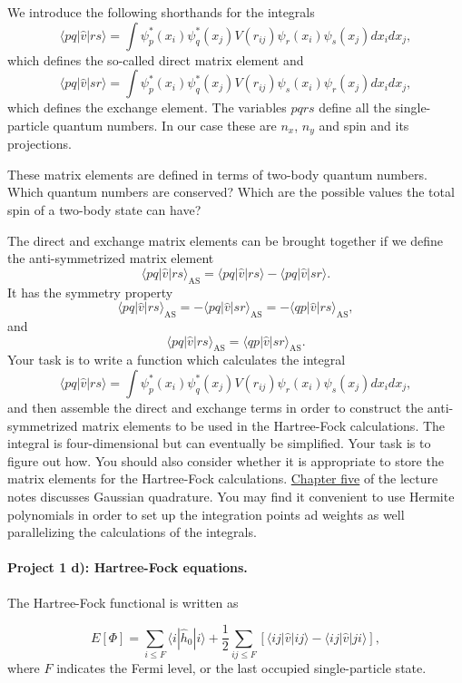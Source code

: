 \documentclass[%
oneside,                 %
final,                   %
10pt]{article}
\begin{document}
We introduce the following shorthands for the  integrals
\[
\langle pq|\hat{v}|rs\rangle =  \int \psi_{p}^*(x_i)\psi_{q}^*(x_j)V(r_{ij})\psi_{r}(x_i)\psi_{s}(x_j)
    dx_idx_j,
\]
which defines the so-called direct matrix element 
and
\[
\langle pq|\hat{v}|sr\rangle = \int \psi_{p}^*(x_i)\psi_{q}^*(x_j)
  V(r_{ij})\psi_{s}(x_i)\psi_{r}(x_j)
  dx_idx_j,  
\]
which defines the exchange element. The variables $pqrs$ define all the single-particle quantum numbers. In our case these are $n_x$, $n_y$ and spin and its projections.

These matrix elements are defined in terms of two-body quantum numbers. Which quantum numbers are conserved?
Which are  the possible values the total spin of a two-body state can have?

The direct and exchange matrix elements can be  brought together if we define the anti-symmetrized matrix element
\[
\langle pq|\hat{v}|rs\rangle_{\mathrm{AS}}= \langle pq|\hat{v}|rs\rangle-\langle pq|\hat{v}|sr\rangle.
\]
It has the symmetry property
\[
\langle pq|\hat{v}|rs\rangle_{\mathrm{AS}}= -\langle pq|\hat{v}|sr\rangle_{\mathrm{AS}}=-\langle qp|\hat{v}|rs\rangle_{\mathrm{AS}},
\]
and
\[
\langle pq|\hat{v}|rs\rangle_{\mathrm{AS}}= \langle qp|\hat{v}|sr\rangle_{\mathrm{AS}}.
\]
Your task is to write a function which calculates the integral 
\[
\langle pq|\hat{v}|rs\rangle =  \int \psi_{p}^*(x_i)\psi_{q}^*(x_j)V(r_{ij})\psi_{r}(x_i)\psi_{s}(x_j)
    dx_idx_j,
\]
and then assemble the direct and exchange terms in order to construct the anti-symmetrized matrix elements to be used in the Hartree-Fock calculations. The integral is four-dimensional but can eventually be simplified. Your task is to figure out how. You should also consider whether it is appropriate to store the matrix elements for the Hartree-Fock calculations.  \href{{https://github.com/CompPhysics/ComputationalPhysics2/blob/gh-pages/doc/Literature/lectures2015.pdf}}{Chapter five} of the lecture notes discusses Gaussian quadrature. You may find it convenient to use Hermite   polynomials in order to set up the integration points ad weights as well parallelizing the calculations of the integrals. 


\paragraph{Project 1 d): Hartree-Fock equations.}
The Hartree-Fock functional is written as

\begin{equation*}
  E[\Phi] 
  = \sum_{i\le F} \langle i | \hat{h}_0 | i\rangle+ \frac{1}{2}\sum_{ij \le F}\left[\langle ij |\hat{v}|ij\rangle-\langle ij |\hat{v}|ji\rangle\right],
\end{equation*}
where $F$ indicates the Fermi level, or the last occupied single-particle state.
\end{document}
